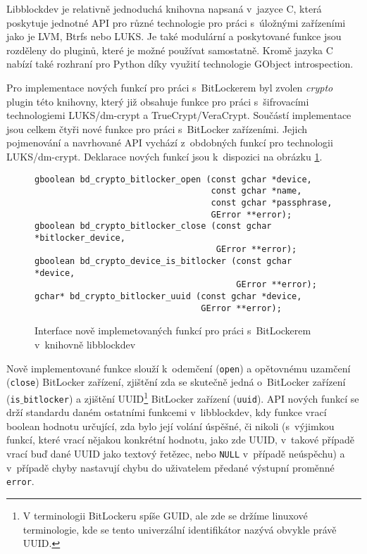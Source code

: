 Libblockdev je relativně jednoduchá knihovna napsaná v~jazyce C, která poskytuje jednotné API pro různé technologie pro práci s~úložnými zařízeními jako je LVM, Btrfs nebo LUKS. Je také modulární a poskytované funkce jsou rozděleny do pluginů, které je možné používat samostatně. Kromě jazyka C nabízí také rozhraní pro Python díky využití technologie GObject introspection.\cite{Podzimek2015}

Pro implementace nových funkcí pro práci s~BitLockerem byl zvolen \emph{crypto} plugin této knihovny, který již obsahuje funkce pro práci s~šifrovacími technologiemi LUKS/dm-crypt a TrueCrypt/VeraCrypt. Součástí implementace jsou celkem čtyři nové funkce pro práci s~BitLocker zařízeními. Jejich pojmenování a navrhované API vychází z~obdobných funkcí pro technologii LUKS/dm-crypt. Deklarace nových funkcí jsou k~dispozici na obrázku \ref{fig:libblockdev-bitlocker}.

\begin{figure}[h]
		\centering
		\captionsetup{width=0.65\linewidth}
\begin{lstlisting}[frame=none, basicstyle=\ttfamily\small, columns=fullflexible, keepspaces=true, xleftmargin=.1\textwidth, xrightmargin=.1\textwidth]
gboolean bd_crypto_bitlocker_open (const gchar *device,
                                   const gchar *name,
                                   const gchar *passphrase,
                                   GError **error);
gboolean bd_crypto_bitlocker_close (const gchar *bitlocker_device,
                                    GError **error);
gboolean bd_crypto_device_is_bitlocker (const gchar *device,
                                        GError **error);
gchar* bd_crypto_bitlocker_uuid (const gchar *device,
                                 GError **error);

\end{lstlisting}
		\caption{Interface nově implemetovaných funkcí pro práci s~BitLockerem v~knihovně libblockdev}
		\label{fig:libblockdev-bitlocker}
\end{figure}

Nově implementované funkce slouží k~odemčení (\texttt{open}) a opětovnému uzamčení (\texttt{close}) BitLocker zařízení, zjištění zda se skutečně jedná o~BitLocker zařízení \\(\texttt{is$\_$bitlocker}) a zjištění UUID\footnote{V terminologii BitLockeru spíše GUID, ale zde se držíme linuxové terminologie, kde se tento univerzální identifikátor nazývá obvykle právě UUID.} BitLocker zařízení (\texttt{uuid}). API nových funkcí se drží standardu daném ostatními funkcemi v~libblockdev, kdy funkce vrací boolean hodnotu určující, zda bylo její volání úspěšné, či nikoli (s~výjimkou funkcí, které vrací nějakou konkrétní hodnotu, jako zde UUID, v~takové případě vrací buď dané UUID jako textový řetězec, nebo \texttt{NULL} v~případě neúspěchu) a v~případě chyby nastavují chybu do uživatelem předané výstupní proměnné \texttt{error}.

